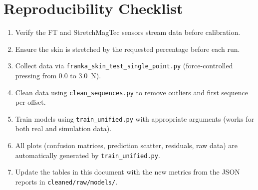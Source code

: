 \documentclass[11pt,a4paper]{article}
\begin{document}
\section*{Reproducibility Checklist}
\begin{enumerate}[leftmargin=1.5em]
    \item Verify the FT and StretchMagTec sensors stream data before calibration.
    \item Ensure the skin is stretched by the requested percentage before each run.
    \item Collect data via \texttt{franka\_skin\_test\_single\_point.py} (force-controlled pressing from 0.0 to 3.0~N).
    \item Clean data using \texttt{clean\_sequences.py} to remove outliers and first sequence per offset.
    \item Train models using \texttt{train\_unified.py} with appropriate arguments (works for both real and simulation data).
    \item All plots (confusion matrices, prediction scatter, residuals, raw data) are automatically generated by \texttt{train\_unified.py}.
    \item Update the tables in this document with the new metrics from the JSON reports in \texttt{cleaned/raw/models/}.
\end{enumerate}
\appendix
\end{document}
